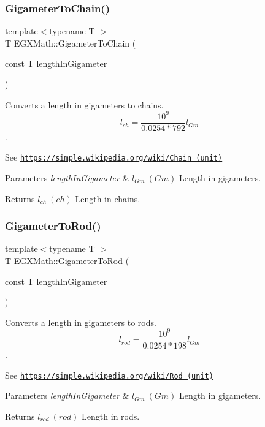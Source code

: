 \subsubsection{\texorpdfstring{Gigameter\+To\+Chain()}{GigameterToChain()}}
{\footnotesize\ttfamily template$<$typename T $>$ \\
T E\+G\+X\+Math\+::\+Gigameter\+To\+Chain (\begin{DoxyParamCaption}\item[{const T}]{length\+In\+Gigameter }\end{DoxyParamCaption})}



Converts a length in gigameters to chains. \[ l_{ch}= \frac{10^{9}}{0.0254 * 792} l_{Gm} \]. 

See \href{https://simple.wikipedia.org/wiki/Chain_(unit)}{\tt https\+://simple.\+wikipedia.\+org/wiki/\+Chain\+\_\+(unit)} 
\begin{DoxyParams}{Parameters}
{\em length\+In\+Gigameter} & $ l_{Gm}\ (Gm)$ Length in gigameters. \\
\hline
\end{DoxyParams}
\begin{DoxyReturn}{Returns}
$ l_{ch}\ (ch)$ Length in chains. 
\end{DoxyReturn}
\mbox{\label{group___e_g_x_math-_conversions-_length_conversions-_s_i-_gigameter-_surveyors_ga73a408111b846e3cb97aa1990135ec46}} 
\subsubsection{\texorpdfstring{Gigameter\+To\+Rod()}{GigameterToRod()}}
{\footnotesize\ttfamily template$<$typename T $>$ \\
T E\+G\+X\+Math\+::\+Gigameter\+To\+Rod (\begin{DoxyParamCaption}\item[{const T}]{length\+In\+Gigameter }\end{DoxyParamCaption})}



Converts a length in gigameters to rods. \[ l_{rod}= \frac{10^{9}}{0.0254 * 198} l_{Gm} \]. 

See \href{https://simple.wikipedia.org/wiki/Rod_(unit)}{\tt https\+://simple.\+wikipedia.\+org/wiki/\+Rod\+\_\+(unit)} 
\begin{DoxyParams}{Parameters}
{\em length\+In\+Gigameter} & $ l_{Gm}\ (Gm)$ Length in gigameters. \\
\hline
\end{DoxyParams}
\begin{DoxyReturn}{Returns}
$ l_{rod}\ (rod)$ Length in rods. 
\end{DoxyReturn}

